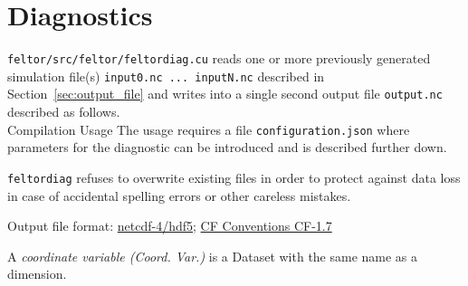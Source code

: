 \section{Diagnostics}\label{sec:diagnostics}
\texttt{feltor/src/feltor/feltordiag.cu}
reads one or more previously generated simulation file(s) \texttt{input0.nc
 ... inputN.nc} described in Section~\ref{sec:output_file} and writes into a
 single second output file \texttt{output.nc} described as follows. \\
Compilation
\noindent Usage
The usage requires a file \texttt{configuration.json} where parameters for the diagnostic can be introduced and is described further down.
\begin{tcolorbox}[title=Note]
\texttt{feltordiag} refuses to overwrite existing files in order to protect against data loss in case of accidental spelling
errors or other careless mistakes.
\end{tcolorbox}

Output file format: \href{https://www.unidata.ucar.edu/software/netcdf/docs/}{netcdf-4/hdf5};
\href{http://cfconventions.org/Data/cf-conventions/cf-conventions-1.7/cf-conventions.html}{CF Conventions CF-1.7}

A \textit{coordinate variable (Coord. Var.)} is a Dataset with the same name as a dimension.

